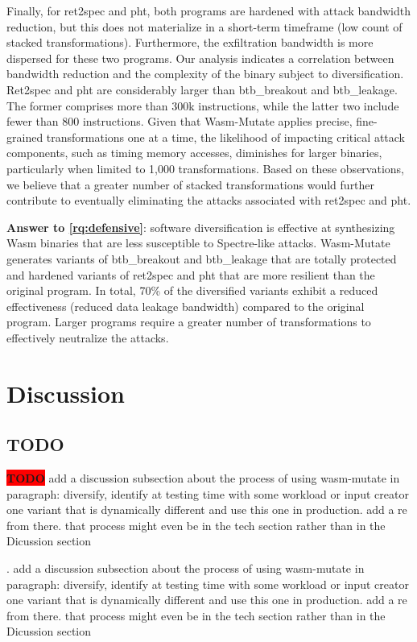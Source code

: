 \documentclass[sigplan,screen]{acmart}
\newcommand*\badge[1]{ \colorbox{red}{\color{white}#1}}
\newcommand{\tool}{{\sc Wasm-Mutate}\xspace}
\newcommand{\wasm}{Wasm\xspace}
\newcommand{\todo}[1]{%
\refstepcounter{todo}
\noindent\textbf{\badge{TODO}} {\color{red}#1}
\addcontentsline{td}{todo}
{\color{red}\thesection.\thetodo\xspace #1}}
\begin{document}
Finally, for ret2spec and pht, both programs are hardened with attack bandwidth reduction, but this does not materialize in a short-term timeframe (low count of stacked transformations).
Furthermore,  the exfiltration bandwidth is more dispersed for these two programs.
Our analysis indicates a correlation between bandwidth reduction and the complexity of the binary subject to diversification.
Ret2spec and pht are considerably larger than btb\_breakout and btb\_leakage.
The former comprises more than 300k instructions, while the latter two include fewer than 800 instructions.
Given that \tool applies precise, fine-grained transformations one at a time, the likelihood of impacting critical attack components, such as timing memory accesses, diminishes for larger binaries, particularly when limited to 1,000 transformations.
Based on these observations, we believe that a greater number of stacked transformations would further contribute to eventually eliminating the attacks associated with ret2spec and pht.


\begin{tcolorbox}[boxrule=1pt,arc=.3em,boxsep=-1.3mm]
  \textbf{Answer to \ref{rq:defensive}}:   software diversification is effective at synthesizing \wasm binaries that are less susceptible  to Spectre-like attacks.  
  \tool generates variants of btb\_breakout and btb\_leakage that are totally protected and hardened variants of ret2spec and pht that are more resilient than the original program.
  In total, 70\% of the diversified variants exhibit a reduced effectiveness (reduced data leakage bandwidth) compared to the original program.
  Larger programs require a greater number of transformations to effectively neutralize the attacks.
\end{tcolorbox}



\section{Discussion}
\label{discussion}

\subsection{TODO} 

\todo{add a discussion subsection about the process of using wasm-mutate in paragraph: diversify, identify at testing time with some workload or input creator one variant that is dynamically different and use this one in production. add a re from there. that process might even be in the tech section rather than in the Dicussion section}
\end{document}
